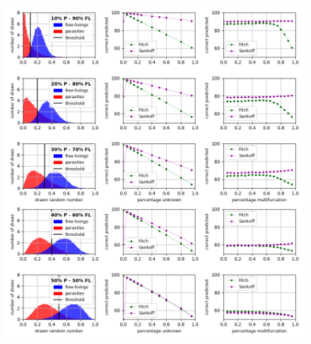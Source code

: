     \begin{figure}[h!]
      \centering
      \includegraphics[trim = 0mm 108mm 0mm 0mm, clip, width=\textwidth]{Figures/simulation_evaluation_1.png}
    \end{figure}
